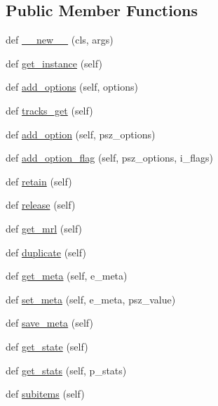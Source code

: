 \subsection*{Public Member Functions}
\begin{DoxyCompactItemize}
\item 
def \hyperlink{classvlc_1_1_media_acc2aa3fac6a63e8bac4f19efc327102b}{\+\_\+\+\_\+new\+\_\+\+\_\+} (cls, args)
\item 
def \hyperlink{classvlc_1_1_media_a56c15bafa43c856366863fc07fc4021f}{get\+\_\+instance} (self)
\item 
def \hyperlink{classvlc_1_1_media_afc1d9bd3735629f1ffba0c9c18c9306c}{add\+\_\+options} (self, options)
\item 
def \hyperlink{classvlc_1_1_media_a63becd5b42e2d084abff82ae94d284ba}{tracks\+\_\+get} (self)
\item 
def \hyperlink{classvlc_1_1_media_a408d85bfeb76d82131e6e8e817c37e0d}{add\+\_\+option} (self, psz\+\_\+options)
\item 
def \hyperlink{classvlc_1_1_media_acac9b8f87cc487439af1e94a5cfb60ae}{add\+\_\+option\+\_\+flag} (self, psz\+\_\+options, i\+\_\+flags)
\item 
def \hyperlink{classvlc_1_1_media_a6394d82a0b79f0f91bb059d20ab43490}{retain} (self)
\item 
def \hyperlink{classvlc_1_1_media_a4cd51e19135e5ad4a19eae3ea9c60537}{release} (self)
\item 
def \hyperlink{classvlc_1_1_media_ad16baf151ea7a01a45c3c343700f9bb6}{get\+\_\+mrl} (self)
\item 
def \hyperlink{classvlc_1_1_media_a738b65df9cba04f72e14313803fc60bb}{duplicate} (self)
\item 
def \hyperlink{classvlc_1_1_media_ae1d2cbf8cdcc58f21b6233ceb681bac6}{get\+\_\+meta} (self, e\+\_\+meta)
\item 
def \hyperlink{classvlc_1_1_media_ab63d1b7198c0dd05a956a14bb884d462}{set\+\_\+meta} (self, e\+\_\+meta, psz\+\_\+value)
\item 
def \hyperlink{classvlc_1_1_media_a24cb83ba2ba5d7060ba6541c5401b175}{save\+\_\+meta} (self)
\item 
def \hyperlink{classvlc_1_1_media_adf1f4fd59e6ea40d38c2b677a757007f}{get\+\_\+state} (self)
\item 
def \hyperlink{classvlc_1_1_media_a26b214f5903f07d59990ad524ef188b0}{get\+\_\+stats} (self, p\+\_\+stats)
\item 
def \hyperlink{classvlc_1_1_media_a5ce1777be74ad9a14c8e7730d0d67b21}{subitems} (self)

\end{DoxyCompactItemize}

